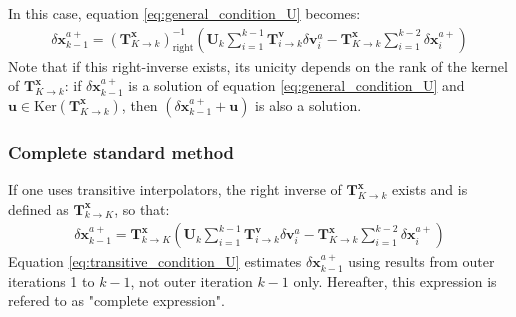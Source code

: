 \documentclass[npg, manuscript]{copernicus}
\begin{document}
In this case, equation \eqref{eq:general_condition_U} becomes:
\begin{align}
\label{eq:general_condition_U_right_inverse}
\delta \mathbf{x}^{a+}_{k-1} = \left(\mathbf{T}^\mathbf{x}_{K \rightarrow k}\right)^{-1}_\text{right}  \left(\mathbf{U}_k \sum_{i=1}^{k-1} \mathbf{T}^\mathbf{v}_{i \rightarrow k} \delta \mathbf{v}^a_i - \mathbf{T}^\mathbf{x}_{K \rightarrow k} \sum_{i=1}^{k-2} \delta \mathbf{x}^{a+}_i\right)
\end{align}
Note that if this right-inverse exists, its unicity depends on the rank of the kernel of $\mathbf{T}^\mathbf{x}_{K \rightarrow k}$: if $\delta \mathbf{x}^{a+}_{k-1}$ is a solution of equation \eqref{eq:general_condition_U} and $\mathbf{u} \in \textrm{Ker}\left(\mathbf{T}^\mathbf{x}_{K \rightarrow k}\right)$, then $\left(\delta \mathbf{x}^{a+}_{k-1}+\mathbf{u}\right)$ is also a solution.

\subsubsection{Complete standard method}
If one uses transitive interpolators, the right inverse of $\mathbf{T}^\mathbf{x}_{K \rightarrow k}$ exists and is defined as $\mathbf{T}^\mathbf{x}_{k \rightarrow K}$, so that:
\begin{align}
\label{eq:transitive_condition_U}
\boxed{\delta \mathbf{x}^{a+}_{k-1} = \mathbf{T}^\mathbf{x}_{k \rightarrow K} \left(\mathbf{U}_k \sum_{i=1}^{k-1} \mathbf{T}^\mathbf{v}_{i \rightarrow k} \delta \mathbf{v}^a_i - \mathbf{T}^\mathbf{x}_{K \rightarrow k} \sum_{i=1}^{k-2} \delta \mathbf{x}^{a+}_i\right)}
\end{align}
Equation \eqref{eq:transitive_condition_U} estimates $\delta \mathbf{x}^{a+}_{k-1}$ using results from outer iterations 1 to $k-1$, not outer iteration $k-1$ only.  Hereafter, this expression is refered to as "complete expression".
\end{document}

